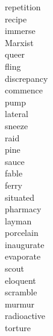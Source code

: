 \documentclass[b5paper, 11pt]{ctexart}
\begin{document}
\begin{multicols*}{3}
\begin{description}
\item[repetition]

\item[recipe]

\item[immerse]

\item[Marxist]

\item[queer]

\item[fling]

\item[discrepancy]

\item[commence]

\item[pump]

\item[lateral]

\item[sneeze]

\item[raid]

\item[pine]

\item[sauce]

\item[fable]

\item[ferry]

\item[situated]

\item[pharmacy]

\item[layman]

\item[porcelain]

\item[inaugurate]

\item[evaporate]

\item[scout]

\item[eloquent]

\item[scramble]

\item[murmur]

\item[radioactive]

\item[torture]


\end{description}
\end{multicols*}
\end{document}
